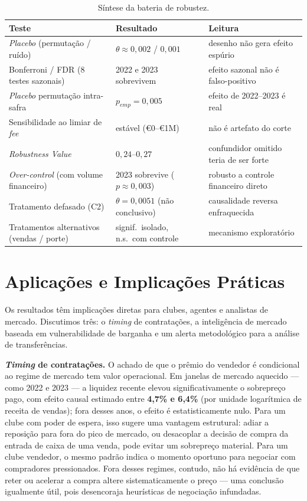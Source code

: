 \documentclass[12pt]{article}
\begin{document}
\begin{table}[ht]
\centering
\caption{Síntese da bateria de robustez.}
\label{tab:robustez}
\begin{tabular}{lll}
\toprule
\textbf{Teste} & \textbf{Resultado} & \textbf{Leitura} \\
\midrule
\textit{Placebo} (permutação / ruído)      & $\theta \approx 0{,}002$ / $0{,}001$ & desenho não gera efeito espúrio \\
Bonferroni / FDR (8 testes sazonais)        & 2022 e 2023 sobrevivem & efeito sazonal não é falso-positivo \\
\textit{Placebo} permutação intra-safra     & $p_{emp} = 0{,}005$ & efeito de 2022--2023 é real \\
Sensibilidade ao limiar de \textit{fee}     & estável (€0--€1M) & não é artefato do corte \\
\textit{Robustness Value}                   & $0{,}24$--$0{,}27$ & confundidor omitido teria de ser forte \\
\textit{Over-control} (com volume financeiro)& 2023 sobrevive ($p\approx0{,}003$) & robusto a controle financeiro direto \\
Tratamento defasado (C2)                     & $\theta = 0{,}0051$ (não conclusivo) & causalidade reversa enfraquecida \\
Tratamentos alternativos (vendas / porte)    & signif.\ isolado, n.s.\ com controle & mecanismo exploratório \\
\bottomrule
\end{tabular}
\end{table}

\section{Aplicações e Implicações Práticas}
\label{sec:aplicacoes}

Os resultados têm implicações diretas para clubes, agentes e analistas de mercado. Discutimos três:
o \textit{timing} de contratações, a inteligência de mercado baseada em vulnerabilidade de barganha
e um alerta metodológico para a análise de transferências.

\textbf{\textit{Timing} de contratações.} O achado de que o prêmio do vendedor é condicional ao
regime de mercado tem valor operacional. Em janelas de mercado aquecido — como 2022 e 2023 — a
liquidez recente elevou significativamente o sobrepreço pago, com efeito causal estimado entre
\textbf{4,7\% e 6,4\%} (por unidade logarítmica de receita de vendas); fora desses anos, o efeito é
estatisticamente nulo. Para um clube com poder de espera, isso sugere uma vantagem estrutural: adiar a
reposição para fora do pico de mercado, ou desacoplar a decisão de compra da entrada de caixa de uma
venda, pode evitar um sobrepreço material. Para um clube vendedor, o mesmo padrão indica o momento
oportuno para negociar com compradores pressionados. Fora desses regimes, contudo, não há evidência
de que reter ou acelerar a compra altere sistematicamente o preço — uma conclusão igualmente útil,
pois desencoraja heurísticas de negociação infundadas.
\end{document}
